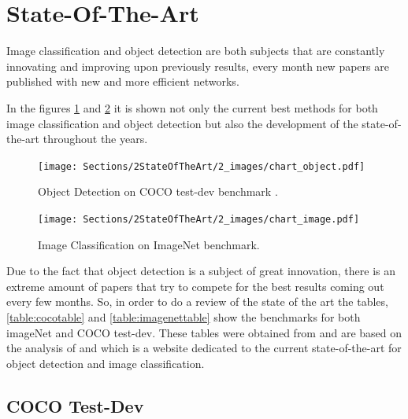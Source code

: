     \newpage  



\section{State-Of-The-Art}
\label{sec:state}

\par Image classification and object detection are both subjects that are constantly innovating and improving upon previously results, every month new papers are published with new and more efficient networks. 
\par In the figures \ref{fig:leaderboard_object} and \ref{fig:leaderboard_image} it is shown  not only the current best methods for both image classification and object detection but also the development of the state-of-the-art throughout the years.


\begin{figure}[htb]
    \centering
    \texttt{[image: Sections/2StateOfTheArt/2\_images/chart\_object.pdf]}
    \caption{Object Detection on COCO test-dev benchmark .\cite{papers_object}} 
    \label{fig:leaderboard_object}
\end{figure}

\begin{figure}[htb]
    \centering
    \texttt{[image: Sections/2StateOfTheArt/2\_images/chart\_image.pdf]}
    \caption{Image Classification on ImageNet benchmark. \cite{papers_image}} 
    \label{fig:leaderboard_image}

\end{figure}

\par Due to the fact that object detection is a subject of great innovation, there is an extreme amount of papers that try to compete for the best results coming out every few months. So, in order to do a review of the state of the art the tables, \ref{table:cocotable} and \ref{table:imagenettable} show the benchmarks for both imageNet and COCO test-dev. These tables were obtained from \cite{Ribeiro} and are based on the analysis of \cite{papers_image} and \cite{papers_object} which is a website dedicated to  the current state-of-the-art for object detection and image classification.


\newpage




\subsection{COCO Test-Dev}

